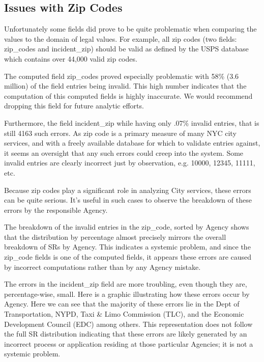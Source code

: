\documentclass[12pt, titlepage]{article}
\begin{document}
	\subsection{Issues with Zip Codes}
	 Unfortunately some fields did prove to be quite problematic when comparing the values to the domain of legal values.
	 For example, all zip codes (two fields: zip\_codes and incident\_zip) should be valid as defined by the USPS database
	 which contains over 44,000 valid zip codes.
	 
	The computed field zip\_codes proved especially problematic with 58\% (3.6 million) of the field entries being invalid.
	This high number indicates that the computation of this computed fields is highly inaccurate. We would recommend
	dropping this field for future analytic efforts.
	
	Furthermore, the field incident\_zip while having only .07\% invalid entries, that is still 4163 such errors. As zip code is
	a primary measure of many NYC city services, and with a freely available database for which to validate entries
	against, it seems an oversight that any such errors could creep into the system. Some invalid entries are 
	clearly incorrect just by observation, e.g. 10000, 12345, 11111, etc. 
	
	Because zip codes play a significant role in analyzing City services, these errors can be quite serious. It's useful in 
	such cases to observe the breakdown of these errors by the responsible Agency. 
	
	The breakdown of the invalid entries in the zip\_code, sorted by Agency shows that the distribution by percentage
	almost precisely mirrors the overall breakdown of SRs by Agency. This indicates a systemic problem, and since the
	zip\_code fields is one of the computed fields, it appears these errors are caused by incorrect computations rather
	than by any Agency mistake.
	
	The  errors in the incident\_zip field are more troubling, even though they are, percentage-wise, small. Here is a graphic 
	illustrating how these errors occur by Agency. Here we can see that the majority of these errors lie in the Dept of Transportation,
	NYPD, Taxi \& Limo Commission (TLC), and the Economic Development Council (EDC) among others. This representation
	does not follow the full SR distribution indicating that these errors are likely generated by an incorrect
	process or application residing at those particular Agencies; it is not a systemic problem.
\end{document}
